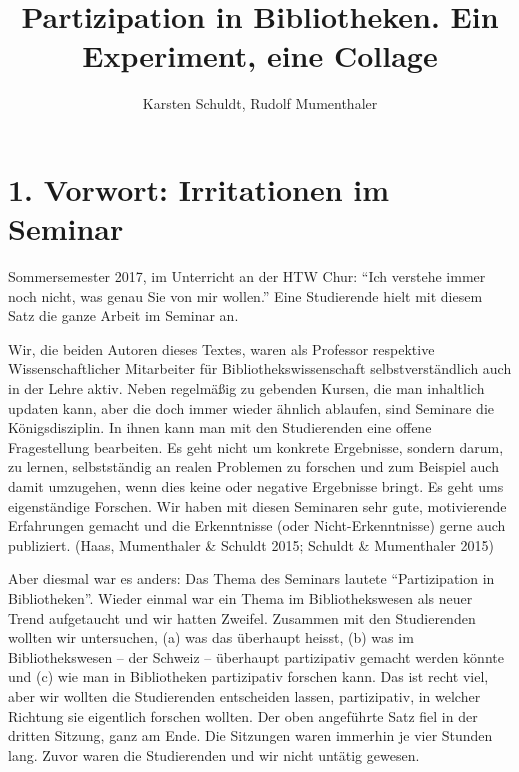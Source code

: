 \documentclass[a4paper,
fontsize=11pt,
oneside,
numbers=noperiodatend,
parskip=half-,
bibliography=totoc,
final
]{scrartcl}
\title{\LARGE{Partizipation in Bibliotheken. Ein Experiment, eine Collage}} %
\author{Karsten Schuldt, Rudolf Mumenthaler} %
\date{}
\begin{document}
\maketitle
\thispagestyle{fancyplain} 


\section{1. Vorwort: Irritationen im
Seminar}\label{vorwort-irritationen-im-seminar}

Sommersemester 2017, im Unterricht an der HTW Chur: \enquote{Ich
verstehe immer noch nicht, was genau Sie von mir wollen.} Eine
Studierende hielt mit diesem Satz die ganze Arbeit im Seminar an.

Wir, die beiden Autoren dieses Textes, waren als Professor respektive
Wissenschaftlicher Mitarbeiter für Bibliothekswissenschaft
selbstverständlich auch in der Lehre aktiv. Neben regelmäßig zu gebenden
Kursen, die man inhaltlich updaten kann, aber die doch immer wieder
ähnlich ablaufen, sind Seminare die Königsdisziplin. In ihnen kann man
mit den Studierenden eine offene Fragestellung bearbeiten. Es geht nicht
um konkrete Ergebnisse, sondern darum, zu lernen, selbstständig an
realen Problemen zu forschen und zum Beispiel auch damit umzugehen, wenn
dies keine oder negative Ergebnisse bringt. Es geht ums eigenständige
Forschen. Wir haben mit diesen Seminaren sehr gute, motivierende
Erfahrungen gemacht und die Erkenntnisse (oder Nicht-Erkenntnisse) gerne
auch publiziert. (Haas, Mumenthaler \& Schuldt 2015; Schuldt \&
Mumenthaler 2015)

Aber diesmal war es anders: Das Thema des Seminars lautete
\enquote{Partizipation in Bibliotheken}. Wieder einmal war ein Thema im
Bibliothekswesen als neuer Trend aufgetaucht und wir hatten Zweifel.
Zusammen mit den Studierenden wollten wir untersuchen, (a) was das
überhaupt heisst, (b) was im Bibliothekswesen -- der Schweiz --
überhaupt partizipativ gemacht werden könnte und (c) wie man in
Bibliotheken partizipativ forschen kann. Das ist recht viel, aber wir
wollten die Studierenden entscheiden lassen, partizipativ, in welcher
Richtung sie eigentlich forschen wollten. Der oben angeführte Satz fiel
in der dritten Sitzung, ganz am Ende. Die Sitzungen waren immerhin je
vier Stunden lang. Zuvor waren die Studierenden und wir nicht untätig
gewesen.
\end{document}
